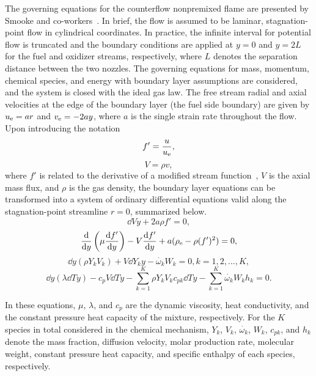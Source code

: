 The governing equations for the counterflow nonpremixed flame are presented by Smooke and co-workers~\cite{giovangigli87,smooke88}.  In brief, the flow is assumed to be laminar, stagnation-point flow in cylindrical coordinates.  In practice, the infinite interval for potential flow is truncated and the boundary conditions are applied at $y = 0$ and $y = 2L$ for the fuel and oxidizer streams, respectively, where $L$ denotes the separation distance between the two nozzles.  The governing equations for mass, momentum, chemical species, and energy with boundary layer assumptions are considered, and the system is closed with the ideal gas law.  The free stream radial and axial velocities at the edge of the boundary layer (the fuel side boundary) are given by $u_{\rm e} = ar$ and $v_{\rm e} = -2ay$, where $a$ is the single strain rate throughout the flow.  Upon introducing the notation
\begin{equation}
f' = \frac{u}{u_{\rm e}},
\end{equation}    
\begin{equation}
V = \rho v,
\end{equation}
where $f'$ is related to the derivative of a modified stream function~\cite{dixon-lewis85}, $V$ is the axial mass flux, and $\rho$ is the gas density, the boundary layer equations can be transformed into a system of ordinary differential equations valid along the stagnation-point streamline $r=0$, summarized below.
\begin{equation}
\dd{V}{y} + 2a\rho f' = 0,
\end{equation}      
\begin{equation}
\frac{\mathrm{d}  }{\mathrm{d} y}\left(\mu \frac{\mathrm{d} f'}{\mathrm{d} y}\right) - V\frac{\mathrm{d} f'}{\mathrm{d} y} + a(\rho_{\rm e} - \rho (f')^2) = 0,
\end{equation}  
\begin{equation}
\dd{ }{y}\left(\rho Y_k V_k\right) + V\dd{Y_k}{y} - \dot{\omega_k}W_k = 0, k = 1,2,...,K,
\end{equation}  
\begin{equation}
\dd{ }{y}\left(\lambda \dd{T}{y} \right) - c_pV\dd{T}{y} - \sum_{k=1}^K \rho Y_k V_k c_{pk} \dd{T}{y} - \sum_{k=1}^K \dot{\omega_k}W_kh_k = 0.
\end{equation}  

In these equations, $\mu$, $\lambda$, and $c_p$ are the dynamic viscosity, heat conductivity, and the constant pressure heat capacity of the mixture, respectively.  For the $K$ species in total considered in the chemical mechanism, $Y_k$, $V_k$, $\dot{\omega_k}$, $W_k$, $c_{pk}$, and $h_k$ denote the mass fraction, diffusion velocity, molar production rate, molecular weight, constant pressure heat capacity, and specific enthalpy of each species, respectively.  

